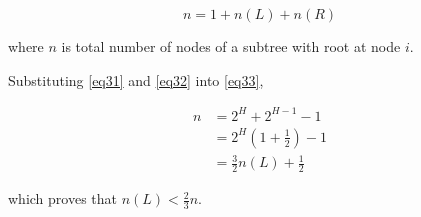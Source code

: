 \begin{equation}\label{eq33}
n = 1 + n(L) + n(R)
\end{equation}

where $n$ is total number of nodes of a subtree with root at node $i$.

Substituting \ref{eq31} and \ref{eq32} into \ref{eq33},

\begin{equation}\label{eq34}
\begin{aligned}
n &= 2^H + 2^{H-1} - 1\\
&= 2^{H} (1 + \frac{1}{2}) - 1\\
&= \frac{3}{2} n(L) + \frac{1}{2}
\end{aligned}
\end{equation}

which proves that $n(L) < \frac{2}{3}n$.
